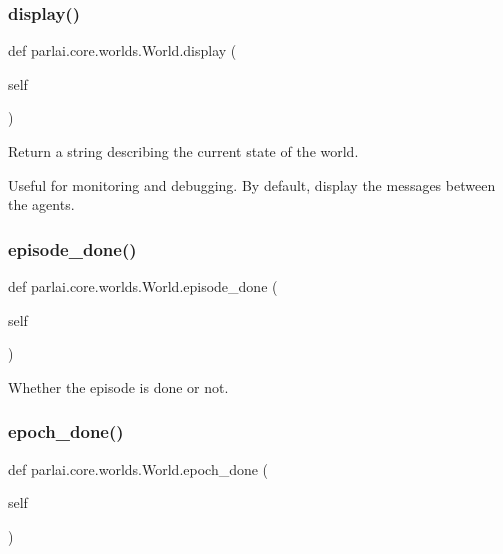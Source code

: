 \subsubsection{\texorpdfstring{display()}{display()}}
{\footnotesize\ttfamily def parlai.\+core.\+worlds.\+World.\+display (\begin{DoxyParamCaption}\item[{}]{self }\end{DoxyParamCaption})}

\begin{DoxyVerb}Return a string describing the current state of the world.

Useful for monitoring and debugging. By default, display the messages between
the agents.
\end{DoxyVerb}
 \mbox{\label{classparlai_1_1core_1_1worlds_1_1World_aaaef76f5bae4cdbe8f78241f8cd7c3a3}} 
\subsubsection{\texorpdfstring{episode\+\_\+done()}{episode\_done()}}
{\footnotesize\ttfamily def parlai.\+core.\+worlds.\+World.\+episode\+\_\+done (\begin{DoxyParamCaption}\item[{}]{self }\end{DoxyParamCaption})}

\begin{DoxyVerb}Whether the episode is done or not.
\end{DoxyVerb}
 \mbox{\label{classparlai_1_1core_1_1worlds_1_1World_aa8a3ab5345bbfa1d485dec974ed28b53}} 
\subsubsection{\texorpdfstring{epoch\+\_\+done()}{epoch\_done()}}
{\footnotesize\ttfamily def parlai.\+core.\+worlds.\+World.\+epoch\+\_\+done (\begin{DoxyParamCaption}\item[{}]{self }\end{DoxyParamCaption})}

